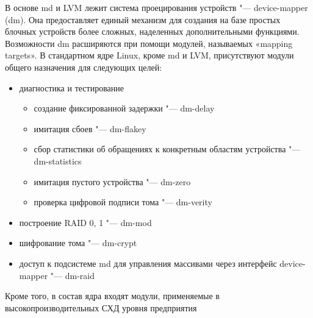 \documentclass[10pt, a5paper]{article}
\begin{document}
В основе md и LVM лежит система проецирования устройств "--- device-mapper (dm). Она предоставляет единый механизм для создания на базе простых блочных устройств более сложных, наделенных дополнительными функциями. Возможности dm расширяются при помощи модулей, называемых «mapping targets». В стандартном ядре Linux, кроме md и LVM, присутствуют модули общего назначения для следующих целей:

\begin{itemize}
  \item диагностика и тестирование\begin{itemize}
  \item создание фиксированной задержки "--- dm-delay
  \item имитация сбоев "--- dm-flakey
  \item сбор статистики об обращениях к конкретным областям устройства "--- dm-statistics
  \item имитация пустого устройства "--- dm-zero
  \item проверка цифровой подписи тома "--- dm-verity
\end{itemize}


  \item построение RAID 0, 1 "--- dm-mod
  \item шифрование тома "--- dm-crypt
  \item доступ к подсистеме md для управления массивами через интерфейс device-mapper "--- dm-raid
\end{itemize}

Кроме того, в состав ядра входят модули, применяемые в высокопроизводительных СХД уровня предприятия
\end{document}
